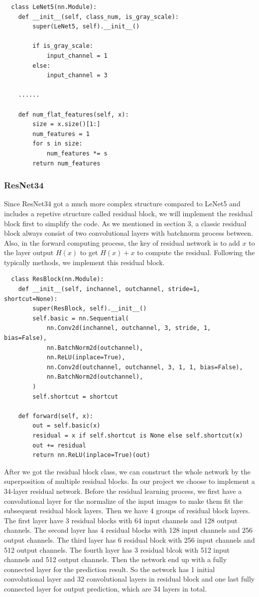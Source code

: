 \documentclass[12pt]{article}
\begin{document}
\begin{lstlisting}
  class LeNet5(nn.Module):
    def __init__(self, class_num, is_gray_scale):
        super(LeNet5, self).__init__()

        if is_gray_scale:
            input_channel = 1
        else:
            input_channel = 3

    ......

    def num_flat_features(self, x):
        size = x.size()[1:]
        num_features = 1
        for s in size:
            num_features *= s
        return num_features
\end{lstlisting}

\subsubsection*{ResNet34}
Since ResNet34 got a much more complex structure compared to LeNet5 and includes a repetive structure called residual block, we will implement the residual block first to simplify the code. As we mentioned in section 3, a classic residual block always consist of two convolutional layers with batchnorm process between. Also, in the forward computing process, the key of residual network is to add $x$ to the layer output $H(x)$ to get $H(x)+x$ to compute the residual. Following the typically methods, we implement this residual block.
\begin{lstlisting}
  class ResBlock(nn.Module):
    def __init__(self, inchannel, outchannel, stride=1, shortcut=None):
        super(ResBlock, self).__init__()
        self.basic = nn.Sequential(
            nn.Conv2d(inchannel, outchannel, 3, stride, 1, bias=False),
            nn.BatchNorm2d(outchannel),
            nn.ReLU(inplace=True),
            nn.Conv2d(outchannel, outchannel, 3, 1, 1, bias=False),
            nn.BatchNorm2d(outchannel),
        )
        self.shortcut = shortcut

    def forward(self, x):
        out = self.basic(x)
        residual = x if self.shortcut is None else self.shortcut(x)
        out += residual
        return nn.ReLU(inplace=True)(out)
\end{lstlisting}

After we got the residual block class, we can construct the whole network by the superposition of multiple residual blocks. In our project we choose to implement a 34-layer residual network. Before the residual learning process, we first have a convolutional layer for the normalize of the input images to make them fit the subsequent residual block layers. Then we have 4 groups of residual block layers. The first layer have 3 residual blocks with 64 input channels and 128 output channels. The second layer has 4 residual blocks with 128 input channels and 256 output channels. The third layer has 6 residual block with 256 input channels and 512 output channels. The fourth layer has 3 residual blcok with 512 input channels and 512 output channels. Then the network end up with a fully connected layer for the prediction result. So the network has 1 initial convolutional layer and 32 convolutional layers in residual block and one last fully connected layer for output prediction, which are 34 layers in total.
\end{document}
